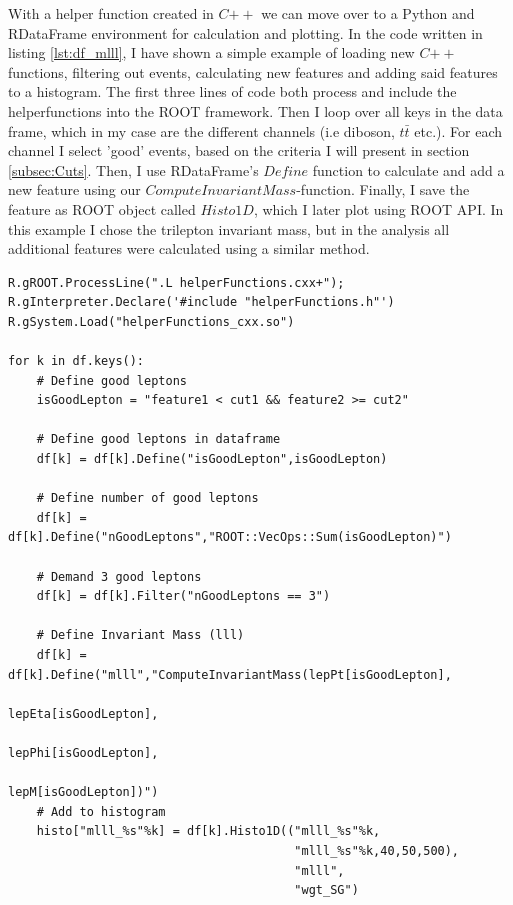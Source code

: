 With a helper function created in $C{++}$ we can move over to a Python and RDataFrame environment
for calculation and plotting. In the code written in listing \ref{lst:df_mlll}, I have shown a simple example 
of loading new $C{++}$ functions, filtering out events, calculating new features and adding said 
features to a histogram. The first three lines of code both process and include the helperfunctions 
into the ROOT framework. Then I loop over all keys in the data frame, which in my case
are the different channels (i.e diboson, $t\bar{t}$ etc.). For each channel I select 'good' events,
based on the criteria I will present in section \ref{subsec:Cuts}. Then, I use RDataFrame's $Define$ function to calculate
and add a new feature using our $ComputeInvariantMass$-function. Finally, I save the feature as ROOT object called 
$Histo1D$, which I later plot using ROOT \ac{API}. In this example I chose the trilepton invariant mass, 
but in the analysis all additional features were calculated using a similar method. 
\lstset{style=Python}
\begin{lstlisting}[caption={Python-file for calling dataframe and calculating $M_{lll}$.},captionpos=b, label={lst:df_mlll}]
R.gROOT.ProcessLine(".L helperFunctions.cxx+");
R.gInterpreter.Declare('#include "helperFunctions.h"') 
R.gSystem.Load("helperFunctions_cxx.so")

for k in df.keys():
    # Define good leptons
    isGoodLepton = "feature1 < cut1 && feature2 >= cut2"

    # Define good leptons in dataframe
    df[k] = df[k].Define("isGoodLepton",isGoodLepton)

    # Define number of good leptons
    df[k] = df[k].Define("nGoodLeptons","ROOT::VecOps::Sum(isGoodLepton)")

    # Demand 3 good leptons 
    df[k] = df[k].Filter("nGoodLeptons == 3")

    # Define Invariant Mass (lll)
    df[k] = df[k].Define("mlll","ComputeInvariantMass(lepPt[isGoodLepton], 
                                                      lepEta[isGoodLepton], 
                                                      lepPhi[isGoodLepton], 
                                                      lepM[isGoodLepton])")
    # Add to histogram
    histo["mlll_%s"%k] = df[k].Histo1D(("mlll_%s"%k,
                                        "mlll_%s"%k,40,50,500),
                                        "mlll",
                                        "wgt_SG")     
\end{lstlisting}




